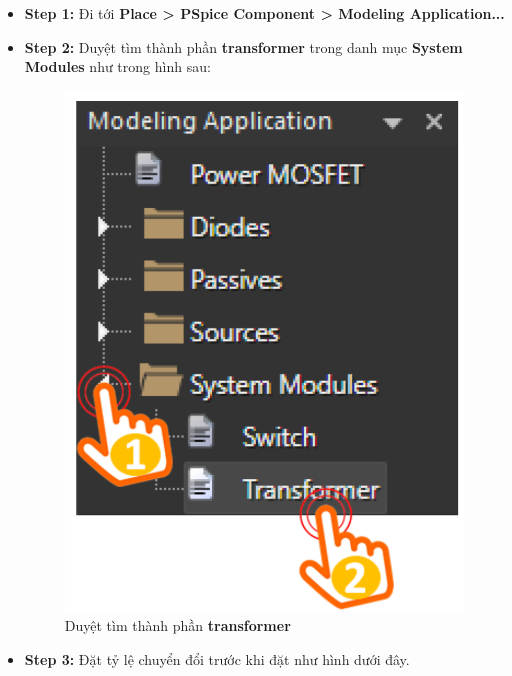     \begin{itemize}
    \item \textbf{Step 1:} Đi tới \textbf{Place > PSpice Component > Modeling Application...}
    \item \textbf{Step 2:} Duyệt tìm thành phần \textbf{transformer} trong danh mục \textbf{System Modules} như trong hình sau: 
\begin{figure}[ht]
{\centering
    \includegraphics[scale=0.24]{graphics/ex7/f2.png}
    \caption{Duyệt tìm thành phần \textbf{transformer}}}
\end{figure}

    \item \textbf{Step 3:} Đặt tỷ lệ chuyển đổi trước khi đặt như hình dưới đây.


\begin{figure}[ht]
    

\end{figure}
\end{itemize}
